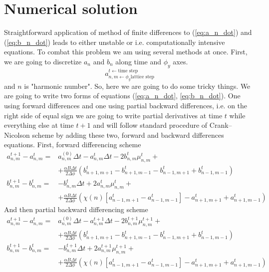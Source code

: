 \documentclass[40pt,letterpaper,physrev]{article}
\begin{document}
    \section{Numerical solution}
   	Straightforward application of method of finite differences 
   	to (\ref{eq:a_n_dot}) and (\ref{eq:b_n_dot}) leads to either 
   	unstable or i.e. computationally intensive equations. To 
   	combat this problem we am using several methods at once.
	First, we are going to discretize $a_{n}$ and $b_{n}$ along 
	time and $\phi_y$ axes.
	\begin{equation}
		a^{\textstyle t\leftarrow\text{time step}}_{\textstyle n,m\leftarrow \phi_y \text{lattice step}}
	\end{equation}
	and $n$ is "harmonic number". So, here we are going to do some tricky things. We are going to write two forms of equations (\ref{eq:a_n_dot}, \ref{eq:b_n_dot}).
	One using forward differences and one using partial backward differences, i.e. on the right side of equal sign we are going to write partial derivatives at time $t$ while everything else at time $t+1$ and will follow standard procedure of Crank–Nicolson scheme by adding these two, 
	forward and backward differences equations. First, forward differencing scheme
	\begin{align}
	a^{t+1}_{n,m}-a^{t}_{n,m}=&a^{(0)}_{n,m}\Delta t-a^t_{n,m}\Delta t-
	2b^t_{n,m}\mu^t_{n,m}+\nonumber \\
	&+\frac{\alpha B\Delta t}{2\Delta\phi}(b^t_{n+1,m+1}-b^t_{n+1,m-1}-b^t_{n-1,m+1}+b^t_{n-1,m-1}) \label{eq:a_forward}\\
	b^{t+1}_{n,m}-b^{t}_{n,m}=&-b^t_{n,m}\Delta t+2a^{t}_{n,m}\mu^t_{n,m}+\nonumber \\
	&+\frac{\alpha B\Delta t}{2\Delta\phi}(\chi(n)[a^t_{n-1,m+1}-a^t_{n-1,m-1}]-a^t_{n+1,m+1}+a^t_{n+1,m-1}) \label{eq:b_forward}
	\end{align}
	And then partial backward differencing scheme
	\begin{align}	
	a^{t+1}_{n,m}-a^{t}_{n,m}=&a^{(0)}_{n,m}\Delta t-a^{t+1}_{n,m}\Delta t-
	2b^{t+1}_{n,m}\mu^{t+1}_{n,m}+\nonumber \\
	&+\frac{\alpha B\Delta t}{2\Delta\phi}(b^t_{n+1,m+1}-b^t_{n+1,m-1}-b^t_{n-1,m+1}+b^t_{n-1,m-1}) \label{eq:a_backward}\\
	b^{t+1}_{n,m}-b^{t}_{n,m}=&-b^{t+1}_{n,m}\Delta t+2a^{t+1}_{n,m}\mu^{t+1}_{n,m}+\nonumber \\
	&+\frac{\alpha B\Delta t}{2\Delta\phi}(\chi(n)[a^t_{n-1,m+1}-a^t_{n-1,m-1}]-a^t_{n+1,m+1}+a^t_{n+1,m-1}) \label{eq:b_backward}
	\end{align}
\end{document}

